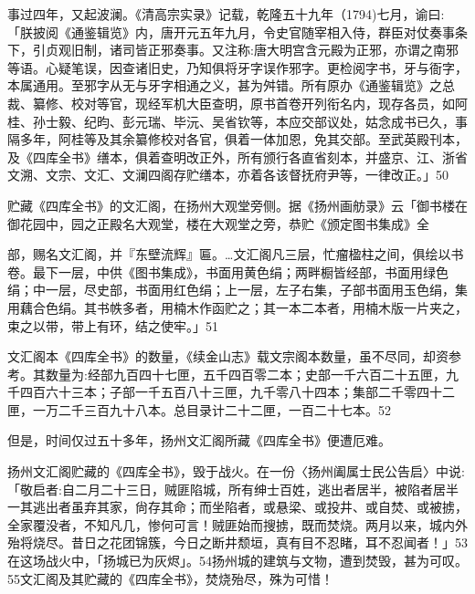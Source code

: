 事过四年，又起波澜。《清高宗实录》记载，乾隆五十九年（1794)七月，谕曰:「朕披阅《通鉴辑览》内，唐开元五年九月，令史官随宰相入侍，群臣对仗奏事条下，引贞观旧制，诸司皆正邪奏事。又注称:唐大明宫含元殿为正邪，亦谓之南邪等语。心疑笔误，因查诸旧史，乃知俱将牙字误作邪字。更检阅字书，牙与衙字，本属通用。至邪字从无与牙字相通之义，甚为舛错。所有原办《通鉴辑览》之总裁、纂修、校对等官，现经军机大臣查明，原书首卷开列衔名内，现存各员，如阿桂、孙士毅、纪昀、彭元瑞、毕沅、吴省钦等，本应交部议处，姑念成书已久，事隔多年，阿桂等及其余纂修校对各官，俱着一体加恩，免其交部。至武英殿刊本，及《四库全书》缮本，俱着查明改正外，所有颁行各直省刻本，并盛京、江、浙省文溯、文宗、文汇、文澜四阁存贮缮本，亦着各该督抚府尹等，一律改正。」50

贮藏《四库全书》的文汇阁，在扬州大观堂旁侧。据《扬州画舫录》云「御书楼在御花园中，园之正殿名大观堂，楼在大观堂之旁，恭贮《颁定图书集成》全

\vfill
\begin{BookNotes}
\end{BookNotes}

\noindent 部，赐名文汇阁，并『东壁流辉』匾。…文汇阁凡三层，忙瘤楹柱之间，俱绘以书卷。最下一层，中供《图书集成》，书面用黄色绢；两畔橱皆经部，书面用绿色绢；中一层，尽史部，书面用红色绢；上一层，左子右集，子部书面用玉色绢，集用藕合色绢。其书帙多者，用楠木作函贮之；其一本二本者，用楠木版一片夹之，束之以带，带上有环，结之使牢。」51

文汇阁本《四库全书》的数量，《续金山志》载文宗阁本数量，虽不尽同，却资参考。其数量为:经部九百四十七匣，五千四百零二本；史部一千六百二十五匣，九千四百六十三本；子部一千五百八十三匣，九千零八十四本；集部二千零四十二匣，一万二千三百九十八本。总目录计二十二匣，一百二十七本。52

但是，时间仅过五十多年，扬州文汇阁所藏《四库全书》便遭厄难。

扬州文汇阁贮藏的《四库全书》，毁于战火。在一份〈扬州阖属士民公告启〉中说:「敬启者:自二月二十三日，贼匪陷城，所有绅士百姓，逃出者居半，被陷者居半一其逃出者虽弃其家，尙存其命；而坐陷者，或悬梁、或投井、或自焚、或被掳，全家覆没者，不知凡几，惨何可言！贼匪始而搜掳，既而焚烧。两月以来，城内外殆将烧尽。昔日之花团锦簇，今日之断井颓垣，真有目不忍睹，耳不忍闻者！」53在这场战火中，「扬城已为灰烬」。54扬州城的建筑与文物，遭到焚毁，甚为可叹。55文汇阁及其贮藏的《四库全书》，焚烧殆尽，殊为可惜！

